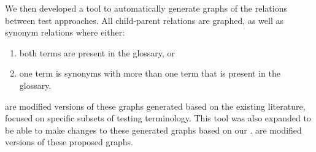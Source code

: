 We then developed a tool to automatically generate graphs of the relations
between test approaches. All child-parent relations are graphed, as well as
synonym relations where either:
\begin{enumerate}
    \item both terms are present in the glossary, or
    \item one term is synonyms with more than one term that is present in the
          glossary.
\end{enumerate}
 are modified versions
of these graphs generated based on the existing literature, focused on specific
subsets of testing terminology. This tool was also expanded to be able to make
changes to these generated graphs based on our .
 are
modified versions of these proposed graphs.
